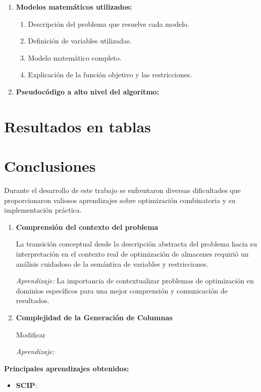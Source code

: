 \documentclass[a4paper,12pt]{article}
\begin{document}
\begin{enumerate}[label=(\alph*), leftmargin=2em]
    \item \textbf{Modelos matemáticos utilizados:}
    \begin{enumerate}[label=\roman*., leftmargin=0.2em]
        \item Descripción del problema que resuelve cada modelo.
        \item Definición de variables utilizadas.
        \item Modelo matemático completo.
        \item Explicación de la función objetivo y las restricciones.
    \end{enumerate}

    \item \textbf{Pseudocódigo a alto nivel del algoritmo:}
\end{enumerate}

\clearpage

\section{Resultados en tablas}

\clearpage

\section{Conclusiones}

Durante el desarrollo de este trabajo se enfrentaron diversas dificultades que proporcionaron valiosos aprendizajes sobre optimización combinatoria y su implementación práctica.

\begin{enumerate}
    \item \textbf{Comprensión del contexto del problema}
    
    La transición conceptual desde la descripción abstracta del problema hacia su interpretación en el contexto real de optimización de almacenes requirió un análisis cuidadoso de la semántica de variables y restricciones.
    
    \emph{Aprendizaje:} La importancia de contextualizar problemas de optimización en dominios específicos para una mejor comprensión y comunicación de resultados.


    \item \textbf{Complejidad de la Generación de Columnas}
    
    Modificar
    
    \emph{Aprendizaje:} 

\end{enumerate}

\textbf{Principales aprendizajes obtenidos:}

\begin{itemize}
    \item \textbf{SCIP}: 
    
\end{itemize}
\end{document}
